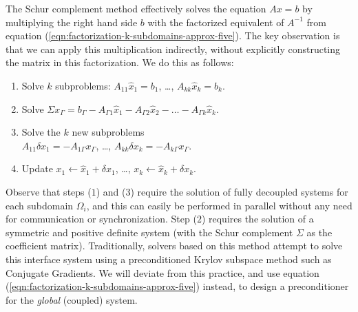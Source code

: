The Schur complement method effectively solves the equation $Ax=b$ by multiplying the right hand side $b$ with the factorized equivalent of $A^{-1}$ from equation 
(\ref{eqn:factorization-k-subdomains-approx-five}). The key observation is that we can apply this multiplication indirectly, without explicitly constructing the
matrix in this factorization. We do this as follows:
\vspace*{-.15in}
\begin{enumerate}
\item
Solve $k$ subproblems: $A_{11}\hat x_1=b_1$, \ldots,  $A_{kk}\hat x_k=b_k$.
\vspace*{-.05in}
\item
Solve $\Sigma x_\Gamma=b_\Gamma-A_{\Gamma 1}\hat x_1-A_{\Gamma 2}\hat x_2 - \ldots -A_{\Gamma k}\hat x_k $.
\vspace*{-.05in}
\item
Solve the $k$ new subproblems\\ $A_{11}\delta x_1=-A_{1\Gamma}x_\Gamma$, \ldots, $A_{kk}\delta x_k=-A_{k\Gamma}x_\Gamma$.
\vspace*{-.05in}
\item
Update $x_1\leftarrow \hat x_1+\delta x_1$, \ldots, $x_k\leftarrow \hat x_k+\delta x_k$.
\end{enumerate}
Observe that steps ($1$) and ($3$) require the solution of fully decoupled systems for each subdomain $\Omega_i$, and this can easily be performed in
parallel without any need for communication or synchronization.
Step ($2$) requires the solution of a symmetric and positive definite system (with the Schur complement $\Sigma$ as the
coefficient matrix). Traditionally, solvers based on this method attempt to solve this interface system using a preconditioned Krylov
subspace method such as Conjugate Gradients. We will deviate from
this practice, and use equation (\ref{eqn:factorization-k-subdomains-approx-five}) instead, to design a preconditioner for the \emph{global} (coupled) system.

